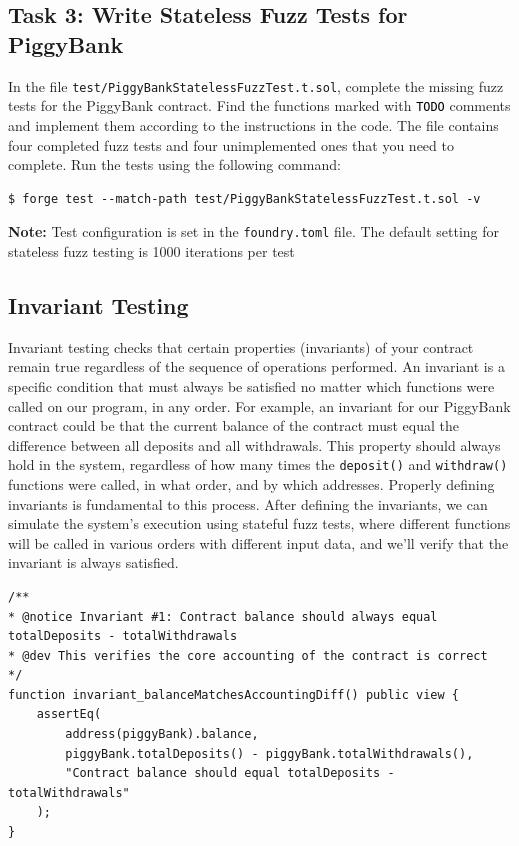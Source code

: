 \documentclass[12pt]{article}
\newcommand{\codegrey}[1]{%
  \texttt{\colorbox{black!4}{\textcolor{black}{#1}}}%
}
\begin{document}
\subsection*{Task 3: Write Stateless Fuzz Tests for PiggyBank}

In the file \texttt{test/PiggyBankStatelessFuzzTest.t.sol}, complete the
missing fuzz tests for the PiggyBank contract. Find the functions marked with
\codegrey{TODO} comments and implement them according to the instructions in
the code. The file contains four completed fuzz tests and four unimplemented
ones that you need to complete. Run the tests using the following command:

\noindent \begin{minipage}{\textwidth}
    \begin{verbatim}
$ forge test --match-path test/PiggyBankStatelessFuzzTest.t.sol -v
\end{verbatim}
\end{minipage}

\noindent
\textbf{Note:} Test configuration is set in the \texttt{foundry.toml} file. The default setting for stateless fuzz testing is 1000 iterations per test

\subsection{Invariant Testing}

Invariant testing checks that certain properties (invariants) of your contract
remain true regardless of the sequence of operations performed. An invariant is
a specific condition that must always be satisfied no matter which functions
were called on our program, in any order. For example, an invariant for our
PiggyBank contract could be that the current balance of the contract must equal
the difference between all deposits and all withdrawals. This property should
always hold in the system, regardless of how many times the \texttt{deposit()}
and \texttt{withdraw()} functions were called, in what order, and by which
addresses. Properly defining invariants is fundamental to this process. After
defining the invariants, we can simulate the system's execution using stateful
fuzz tests, where different functions will be called in various orders with
different input data, and we'll verify that the invariant is always satisfied.

\noindent \begin{minipage}{\textwidth}
    \begin{lstlisting}[language=Solidity]
/**
* @notice Invariant #1: Contract balance should always equal totalDeposits - totalWithdrawals
* @dev This verifies the core accounting of the contract is correct
*/
function invariant_balanceMatchesAccountingDiff() public view {
    assertEq(
        address(piggyBank).balance,
        piggyBank.totalDeposits() - piggyBank.totalWithdrawals(),
        "Contract balance should equal totalDeposits - totalWithdrawals"
    );
}
\end{lstlisting}
\end{minipage}
\end{document}
